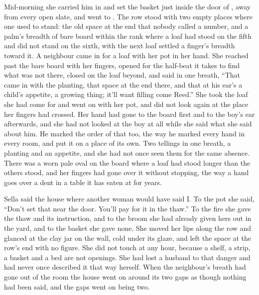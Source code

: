 Mid-morning she carried him in and set the basket just inside the door of , away from every open slate, and went to . The row stood with two empty places where one used to stand: the old space at the end that nobody called a number, and a palm's breadth of bare board within the rank where a loaf had stood on the fifth and did not stand on the sixth, with the next loaf settled a finger's breadth toward it. A neighbour came in for a loaf with her pot in her hand. She reached past the bare board with her fingers, opened for the half-beat it takes to find what was not there, closed on the loaf beyond, and said in one breath, “That came in with the planting, that space at the end there, and that at his ear's a child's appetite, a growing thing; it'll want filling come Reed.” She took the loaf she had come for and went on with her pot, and did not look again at the place her fingers had crossed. Her hand had gone to the board first and to the boy's ear afterwards, and she had not looked at the boy at all while she said what she said about him. He marked the order of that too, the way he marked every hand in every room, and put it on a place of its own. Two tellings in one breath, a planting and an appetite, and she had not once seen them for the same absence. There was a worn pale oval on the board where a loaf had stood longer than the others stood, and her fingers had gone over it without stopping, the way a hand goes over a dent in a table it has eaten at for years.

Sella said the house where another woman would have said I. To the pot she said, “Don't set that near the door. You'll pay for it in the thaw.” To the fire she gave the thaw and its instruction, and to the broom she had already given hers out in the yard, and to the basket she gave none. She moved her lips along the row and glanced at the clay jar on the wall, cold under its glaze, and left the space at the row's end with no figure. She did not touch  at any hour, because a shelf, a strip, a basket and a bed are not openings. She had lost a husband to that danger and had never once described it that way herself. When the neighbour's breath had gone out of the room the house went on around its two gaps as though nothing had been said, and the gaps went on being two.

